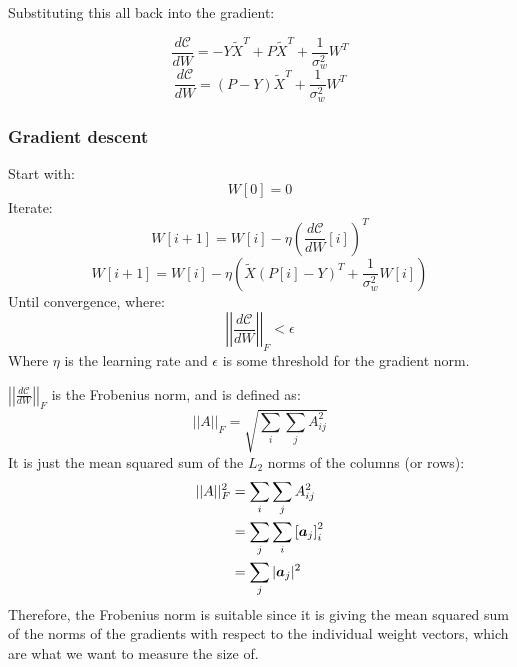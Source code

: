 \documentclass[../../main.tex]{subfiles}
\begin{document}
Substituting this all back into the gradient:

\[ \frac{d\mathcal{C}}{dW} = -Y\tilde{X}^T + P\tilde{X}^T + \frac{1}{\sigma_w^2}W^T \]
\[ \frac{d\mathcal{C}}{dW} = (P-Y)\tilde{X}^T + \frac{1}{\sigma_w^2}W^T \]

\subsubsection{Gradient descent}

Start with:
\[ W[0] = 0 \]
Iterate:
\[ W[i+1] = W[i] - \eta {\left(\frac{d\mathcal{C}}{dW}[i]\right)}^T \]
\[ W[i+1] = W[i] - \eta\left(\tilde{X}{(P[i] - Y)}^T + \frac{1}{\sigma_w^2}W[i]\right)\]
Until convergence, where:
\[ {\left|\left|\frac{d\mathcal{C}}{dW}\right|\right|}_F < \epsilon \]
Where $\eta$ is the learning rate and $\epsilon$ is some threshold for the gradient norm.

${\left|\left|\frac{d\mathcal{C}}{dW}\right|\right|}_F$ is the Frobenius norm, and is defined as:
\[ ||A||_F = \sqrt{\sum_i\sum_j A_{ij}^2} \]
It is just the mean squared sum of the $L_2$ norms of the columns (or rows):
\begin{align*}
||A||_F^2 &= \sum_i\sum_j A_{ij}^2 \\
          &= \sum_j \sum_i {[\bm{a}_j]}_i^2 \\
          &= \sum_j |\bm{a}_j|^2 \\
\end{align*}
Therefore, the Frobenius norm is suitable since it is giving the mean squared sum of the norms of the gradients with respect to the individual weight vectors, which are what we want to measure the size of.
\end{document}

